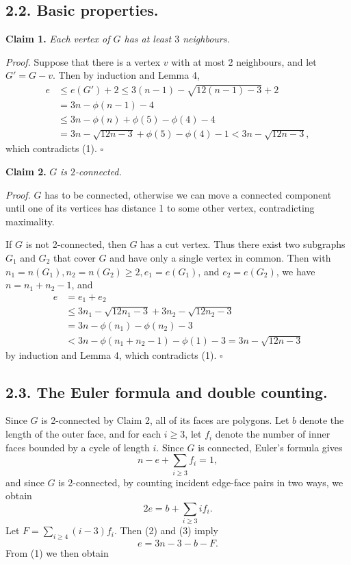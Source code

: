 \documentclass{article}
\begin{document}
\subsection*{2.2. Basic properties.}

\textbf{Claim 1.} \textit{Each vertex of $G$ has at least $3$ neighbours.}

\textit{Proof.} Suppose that there is a vertex $v$ with at most 2 neighbours, and let $G' = G - v$. Then by induction and Lemma 4, 
\begin{align*}
e &\le e(G') + 2 \le 3(n-1) - \sqrt{12(n-1)-3} + 2\\
&= 3n - \phi(n-1) - 4\\
&\le 3n - \phi(n) + \phi(5) - \phi(4) - 4\\
&= 3n - \sqrt{12n-3} + \phi(5) - \phi(4) - 1 < 3n - \sqrt{12n-3},
\end{align*} which contradicts (1). \hfill$\square$

\textbf{Claim 2.} $G$ \textit{is $2$-connected.}

\textit{Proof.} $G$ has to be connected, otherwise we can move a connected component until one of its vertices has distance 1 to some other vertex, contradicting maximality.

If $G$ is not 2-connected, then $G$ has a cut vertex. Thus there exist two subgraphs $G_{1}$ and $G_{2}$ that cover $G$ and have only a single vertex in common. Then with $n_{1} = n(G_{1}), n_{2} = n(G_{2}) \ge 2, e_{1} = e(G_{1})$, and $e_{2} = e(G_{2})$, we have $n = n_{1} + n_{2} - 1$, and 
\begin{align*}
e &= e_1 + e_2\\
&\le 3n_1 - \sqrt{12n_1-3} + 3n_2 - \sqrt{12n_2-3}\\
&= 3n - \phi(n_1) - \phi(n_2) - 3\\
&< 3n - \phi(n_1+n_2-1) - \phi(1) - 3 = 3n - \sqrt{12n-3}
\end{align*} by induction and Lemma 4, which contradicts (1). \hfill$\square$

\subsection*{2.3. The Euler formula and double counting.}

Since $G$ is 2-connected by Claim 2, all of its faces are polygons. Let $b$ denote the length of the outer face, and for each $i \ge 3$, let $f_{i}$ denote the number of inner faces bounded by a cycle of length $i$. Since $G$ is connected, Euler’s formula gives 
\begin{equation*}
n - e + \sum_{i\ge 3} f_i = 1, \tag{2}
\end{equation*} and since $G$ is 2-connected, by counting incident edge-face pairs in two ways, we obtain 
\begin{equation*}
2e = b + \sum_{i\ge 3} i f_i. \tag{3}
\end{equation*} Let $F = \sum_{i\ge 4}(i - 3)f_{i}$. Then (2) and (3) imply 
\begin{equation*}
e = 3n - 3 - b - F. \tag{4}
\end{equation*} From (1) we then obtain
\end{document}
